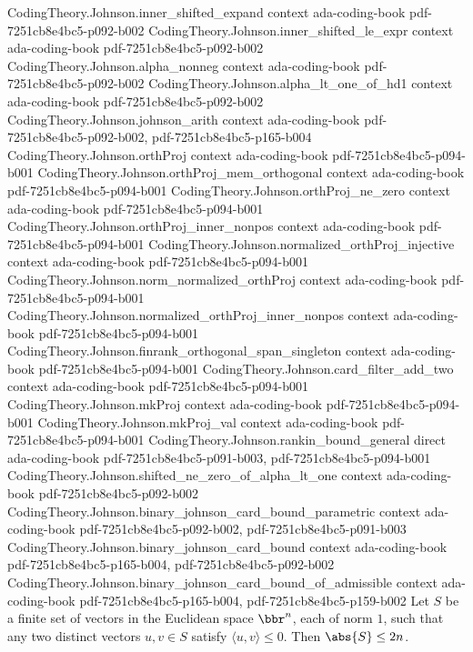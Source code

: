 \begin{theorem}
\proofstep
  {CodingTheory.Johnson.inner_shifted_expand}
  {context}
  {ada-coding-book}
  {pdf-7251cb8e4bc5-p092-b002}
\proofstep
  {CodingTheory.Johnson.inner_shifted_le_expr}
  {context}
  {ada-coding-book}
  {pdf-7251cb8e4bc5-p092-b002}
\proofstep
  {CodingTheory.Johnson.alpha_nonneg}
  {context}
  {ada-coding-book}
  {pdf-7251cb8e4bc5-p092-b002}
\proofstep
  {CodingTheory.Johnson.alpha_lt_one_of_hd1}
  {context}
  {ada-coding-book}
  {pdf-7251cb8e4bc5-p092-b002}
\proofstep
  {CodingTheory.Johnson.johnson_arith}
  {context}
  {ada-coding-book}
  {pdf-7251cb8e4bc5-p092-b002,
    pdf-7251cb8e4bc5-p165-b004}
\proofstep
  {CodingTheory.Johnson.orthProj}
  {context}
  {ada-coding-book}
  {pdf-7251cb8e4bc5-p094-b001}
\proofstep
  {CodingTheory.Johnson.orthProj_mem_orthogonal}
  {context}
  {ada-coding-book}
  {pdf-7251cb8e4bc5-p094-b001}
\proofstep
  {CodingTheory.Johnson.orthProj_ne_zero}
  {context}
  {ada-coding-book}
  {pdf-7251cb8e4bc5-p094-b001}
\proofstep
  {CodingTheory.Johnson.orthProj_inner_nonpos}
  {context}
  {ada-coding-book}
  {pdf-7251cb8e4bc5-p094-b001}
\proofstep
  {CodingTheory.Johnson.normalized_orthProj_injective}
  {context}
  {ada-coding-book}
  {pdf-7251cb8e4bc5-p094-b001}
\proofstep
  {CodingTheory.Johnson.norm_normalized_orthProj}
  {context}
  {ada-coding-book}
  {pdf-7251cb8e4bc5-p094-b001}
\proofstep
  {CodingTheory.Johnson.normalized_orthProj_inner_nonpos}
  {context}
  {ada-coding-book}
  {pdf-7251cb8e4bc5-p094-b001}
\proofstep
  {CodingTheory.Johnson.finrank_orthogonal_span_singleton}
  {context}
  {ada-coding-book}
  {pdf-7251cb8e4bc5-p094-b001}
\proofstep
  {CodingTheory.Johnson.card_filter_add_two}
  {context}
  {ada-coding-book}
  {pdf-7251cb8e4bc5-p094-b001}
\proofstep
  {CodingTheory.Johnson.mkProj}
  {context}
  {ada-coding-book}
  {pdf-7251cb8e4bc5-p094-b001}
\proofstep
  {CodingTheory.Johnson.mkProj_val}
  {context}
  {ada-coding-book}
  {pdf-7251cb8e4bc5-p094-b001}
\proofstep
  {CodingTheory.Johnson.rankin_bound_general}
  {direct}
  {ada-coding-book}
  {pdf-7251cb8e4bc5-p091-b003,
    pdf-7251cb8e4bc5-p094-b001}
\proofstep
  {CodingTheory.Johnson.shifted_ne_zero_of_alpha_lt_one}
  {context}
  {ada-coding-book}
  {pdf-7251cb8e4bc5-p092-b002}
\proofstep
  {CodingTheory.Johnson.binary_johnson_card_bound_parametric}
  {context}
  {ada-coding-book}
  {pdf-7251cb8e4bc5-p092-b002,
    pdf-7251cb8e4bc5-p091-b003}
\proofstep
  {CodingTheory.Johnson.binary_johnson_card_bound}
  {context}
  {ada-coding-book}
  {pdf-7251cb8e4bc5-p165-b004,
    pdf-7251cb8e4bc5-p092-b002}
\proofstep
  {CodingTheory.Johnson.binary_johnson_card_bound_of_admissible}
  {context}
  {ada-coding-book}
  {pdf-7251cb8e4bc5-p165-b004,
    pdf-7251cb8e4bc5-p159-b002}
Let $S$ be a finite set of vectors in the Euclidean space $\bbr^n$, each of norm $1$,
such that any two distinct vectors $u, v \in S$ satisfy $\langle u, v\rangle \le 0$.
Then $\abs{S} \le 2n$.
\end{theorem}

